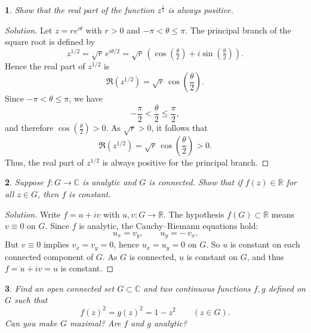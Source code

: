 \documentclass[12pt, a4paper]{report}
\theoremstyle{spaced}
\newtheorem{exercise}{}
\newcommand{\setexercise}[1]{\setcounter{exercise}{#1-1}}
\begin{document}
\setexercise{12}
\begin{exercise}
	Show that the real part of the function \(z^{\frac{1}{2}}\) is always positive.
\end{exercise}
\begin{proof}[Solution]
	Let \(z = re^{i\theta}\) with \(r > 0\) and \(-\pi < \theta \leq \pi\).
	The principal branch of the square root is defined by
	\[
		z^{1/2} = \sqrt{r}\, e^{i\theta/2} = \sqrt{r}\,(\cos(\tfrac{\theta}{2}) + i\sin(\tfrac{\theta}{2})).
	\]
	Hence the real part of \(z^{1/2}\) is
	\[
		\Re(z^{1/2}) = \sqrt{r}\,\cos\!\left(\frac{\theta}{2}\right).
	\]
	Since \(-\pi < \theta \leq \pi\), we have
	\[
		-\frac{\pi}{2} < \frac{\theta}{2} \leq \frac{\pi}{2},
	\]
	and therefore \(\cos(\tfrac{\theta}{2}) > 0\).
	As \(\sqrt{r} > 0\), it follows that
	\[
		\Re(z^{1/2}) = \sqrt{r}\,\cos\!\left(\frac{\theta}{2}\right) > 0.
	\]
	Thus, the real part of \(z^{1/2}\) is always positive for the principal branch.
\end{proof}


\setexercise{14}
\begin{exercise}
	Suppose \(f:G\to\mathbb{C}\) is analytic and \(G\) is connected. Show that if \(f(z)\in\mathbb{R}\) for all \(z\in G\), then \(f\) is constant.
\end{exercise}

\begin{proof}[Solution]
	Write \(f=u+iv\) with \(u,v:G\to\mathbb{R}\). The hypothesis \(f(G)\subset\mathbb{R}\)
	means \(v\equiv 0\) on \(G\). Since \(f\) is analytic, the Cauchy--Riemann equations hold:
	\[
		u_x = v_y,\qquad u_y = -\,v_x .
	\]
	But \(v\equiv 0\) implies \(v_x=v_y=0\), hence \(u_x=u_y=0\) on \(G\). So \(u\) is constant on each connected component
	of \(G\). As \(G\) is connected, \(u\) is constant on \(G\), and thus \(f=u+iv=u\) is constant.

\end{proof}


\setexercise{16}
\begin{exercise}
	Find an open connected set \(G\subset\mathbb{C}\) and two continuous functions \(f,g\) defined on \(G\) such that
	\[
		f(z)^2=g(z)^2=1-z^2\qquad(z\in G).
	\]
	Can you make \(G\) maximal? Are \(f\) and \(g\) analytic?
\end{exercise}
\end{document}
